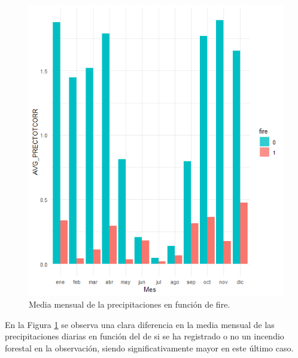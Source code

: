 \documentclass[12pt,a4paper,]{book}
\numberwithin{dummy}{section}
\theoremstyle{ocrenumbox}
\theoremstyle{blacknumex}
\theoremstyle{blacknumbox}
\theoremstyle{ocrenum}
\theoremstyle{ocrenum}
\begin{document}
\begin{figure}[h]
\centering
\includegraphics[width =\textwidth]{graficos/PRECTOTCORR_mes.png}
\caption{Media mensual de la precipitaciones en función de fire.}
\label{fig:PRECTOTCORR_mes}
\end{figure}

En la Figura \ref{fig:PRECTOTCORR_mes} se observa una clara diferencia
en la media mensual de las precipitaciones diarias en función del de si
se ha registrado o no un incendio forestal en la observación, siendo
significativamente mayor en este último caso.
\end{document}
